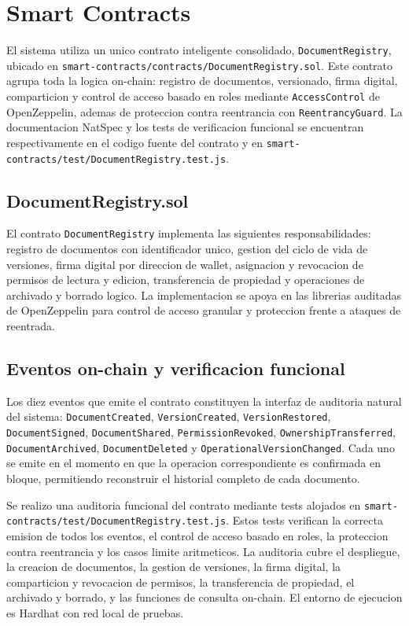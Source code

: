 \documentclass[11pt, a4paper]{article}
\begin{document}
\section{Smart Contracts}

El sistema utiliza un unico contrato inteligente consolidado, \texttt{DocumentRegistry}, ubicado en \texttt{smart-contracts/contracts/DocumentRegistry.sol}. Este contrato agrupa toda la logica on-chain: registro de documentos, versionado, firma digital, comparticion y control de acceso basado en roles mediante \texttt{AccessControl} de OpenZeppelin, ademas de proteccion contra reentrancia con \texttt{ReentrancyGuard}. La documentacion NatSpec y los tests de verificacion funcional se encuentran respectivamente en el codigo fuente del contrato y en \texttt{smart-contracts/test/DocumentRegistry.test.js}.

\subsection{DocumentRegistry.sol}

El contrato \texttt{DocumentRegistry} implementa las siguientes responsabilidades: registro de documentos con identificador unico, gestion del ciclo de vida de versiones, firma digital por direccion de wallet, asignacion y revocacion de permisos de lectura y edicion, transferencia de propiedad y operaciones de archivado y borrado logico. La implementacion se apoya en las librerias auditadas de OpenZeppelin para control de acceso granular y proteccion frente a ataques de reentrada.

\subsection{Eventos on-chain y verificacion funcional}

Los diez eventos que emite el contrato constituyen la interfaz de auditoria natural del sistema: \texttt{DocumentCreated}, \texttt{VersionCreated}, \texttt{VersionRestored}, \texttt{DocumentSigned}, \texttt{DocumentShared}, \texttt{PermissionRevoked}, \texttt{OwnershipTransferred}, \texttt{DocumentArchived}, \texttt{DocumentDeleted} y \texttt{OperationalVersionChanged}. Cada uno se emite en el momento en que la operacion correspondiente es confirmada en bloque, permitiendo reconstruir el historial completo de cada documento.

Se realizo una auditoria funcional del contrato mediante tests alojados en \texttt{smart-contracts/test/DocumentRegistry.test.js}. Estos tests verifican la correcta emision de todos los eventos, el control de acceso basado en roles, la proteccion contra reentrancia y los casos limite aritmeticos. La auditoria cubre el despliegue, la creacion de documentos, la gestion de versiones, la firma digital, la comparticion y revocacion de permisos, la transferencia de propiedad, el archivado y borrado, y las funciones de consulta on-chain. El entorno de ejecucion es Hardhat con red local de pruebas.
\end{document}
